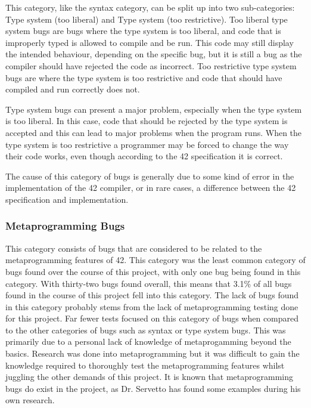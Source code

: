 This category, like the syntax category, can be split up into two sub-categories:  Type system (too liberal) and Type system (too restrictive). Too liberal type system bugs are bugs where the type system is too liberal, and code that is improperly typed is allowed to compile and be run. This code may still display the intended behaviour, depending on the specific bug, but it is still a bug as the compiler should have rejected the code as incorrect. Too restrictive type system bugs are where the type system is too restrictive and code that should have compiled and run correctly does not.

Type system bugs can present a major problem, especially when the type system is too liberal. In this case, code that should be rejected by the type system is accepted and this can lead to major problems when the program runs. When the type system is too restrictive a programmer may be forced to change the way their code works, even though according to the 42 specification it is correct.

The cause of this category of bugs is generally due to some kind of error in the implementation of the 42 compiler, or in rare cases, a difference between the 42 specification and implementation.

\subsubsection{Metaprogramming Bugs \label{meta}}

This category consists of bugs that are considered to be related to the metaprogramming features of 42. This category was the least common category of bugs found over the course of this project, with only one bug being found in this category. With thirty-two bugs found overall, this means that 3.1\% of all bugs found in the course of this project fell into this category. The lack of bugs found in this category probably stems from the lack of metaprogramming testing done for this project. Far fewer tests focused on this category of bugs when compared to the other categories of bugs such as syntax or type system bugs. This was primarily due to a personal lack of knowledge of metaprogamming beyond the basics. Research was done into metaprogramming but it was difficult to gain the knowledge required to thoroughly test the metaprogramming features whilst juggling the other demands of this project. It is known that metaprogramming bugs do exist in the project, as Dr. Servetto has found some examples during his own research.

